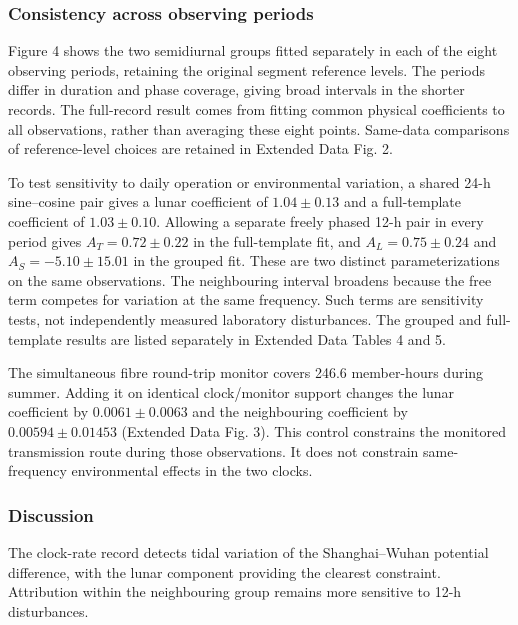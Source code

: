 \documentclass[
  12pt,
  a4paper,
]{article}
\begin{document}
\hypertarget{consistency-across-observing-periods}{%
\subsubsection{Consistency across observing
periods}\label{consistency-across-observing-periods}}

Figure 4 shows the two semidiurnal groups fitted separately in each of
the eight observing periods, retaining the original segment reference
levels. The periods differ in duration and phase coverage, giving broad
intervals in the shorter records. The full-record result comes from
fitting common physical coefficients to all observations, rather than
averaging these eight points. Same-data comparisons of reference-level
choices are retained in Extended Data Fig. 2.

To test sensitivity to daily operation or environmental variation, a
shared 24-h sine--cosine pair gives a lunar coefficient of
\(1.04\pm0.13\) and a full-template coefficient of \(1.03\pm0.10\).
Allowing a separate freely phased 12-h pair in every period gives
\(A_T=0.72\pm0.22\) in the full-template fit, and \(A_L=0.75\pm0.24\)
and \(A_S=-5.10\pm15.01\) in the grouped fit. These are two distinct
parameterizations on the same observations. The neighbouring interval
broadens because the free term competes for variation at the same
frequency. Such terms are sensitivity tests, not independently measured
laboratory disturbances. The grouped and full-template results are
listed separately in Extended Data Tables 4 and 5.

The simultaneous fibre round-trip monitor covers 246.6 member-hours
during summer. Adding it on identical clock/monitor support changes the
lunar coefficient by \(0.0061\pm0.0063\) and the neighbouring
coefficient by \(0.00594\pm0.01453\) (Extended Data Fig. 3). This
control constrains the monitored transmission route during those
observations. It does not constrain same-frequency environmental effects
in the two clocks.

\hypertarget{discussion}{%
\subsubsection{Discussion}\label{discussion}}

The clock-rate record detects tidal variation of the Shanghai--Wuhan
potential difference, with the lunar component providing the clearest
constraint. Attribution within the neighbouring group remains more
sensitive to 12-h disturbances.
\end{document}
